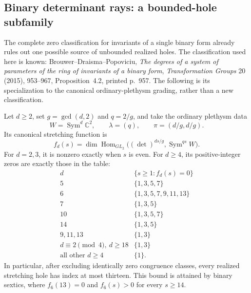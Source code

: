 \subsection{Binary determinant rays: a bounded-hole subfamily}

The complete zero classification for invariants of a single binary form
already rules out one possible source of unbounded realized holes.
The classification used here is known: Brouwer--Draisma--Popoviciu,
\emph{The degrees of a system of parameters of the ring of invariants
of a binary form}, \emph{Transformation Groups} 20 (2015),
953--967, Proposition~4.2, printed p.~957. The following is its
specialization to the canonical ordinary-plethysm grading, rather
than a new classification.

\begin{proposition}
\label{prop:binarydeterminantzeros}
Let $d\ge2$, set $g=\gcd(d,2)$ and $q=2/g$, and take the ordinary
plethysm data
\[
 W=\operatorname{Sym}^d\mathbb C^2,\qquad
 \lambda=(q),\qquad \pi=(d/g,d/g).
\]
Its canonical stretching function is
\[
 f_d(s)=\dim\operatorname{Hom}_{GL_2}
   \bigl((\det)^{ds/g},\operatorname{Sym}^{qs}W\bigr).
 \tag{B-H1}
\]
For $d=2,3$, it is nonzero exactly when $s$ is even.
For $d\ge4$, its positive-integer zeros are exactly those in the table:
\[
\begin{array}{c|l}
 d&\{s\ge1:f_d(s)=0\}\\ \hline
 5&\{1,3,5,7\}\\
 6&\{1,3,5,7,9,11,13\}\\
 7&\{1,3,5\}\\
 10&\{1,3,5,7\}\\
 14&\{1,3,5\}\\
 9,11,13&\{1,3\}\\
 d\equiv2\pmod4,\ d\ge18&\{1,3\}\\
 \text{all other }d\ge4&\{1\}.
\end{array}
 \tag{B-H2}
\]
In particular, after excluding identically zero congruence classes,
every realized stretching hole has index at most thirteen. This
bound is attained by binary sextics, where $f_6(13)=0$ and
$f_6(s)>0$ for every $s\ge14$.
\end{proposition}

